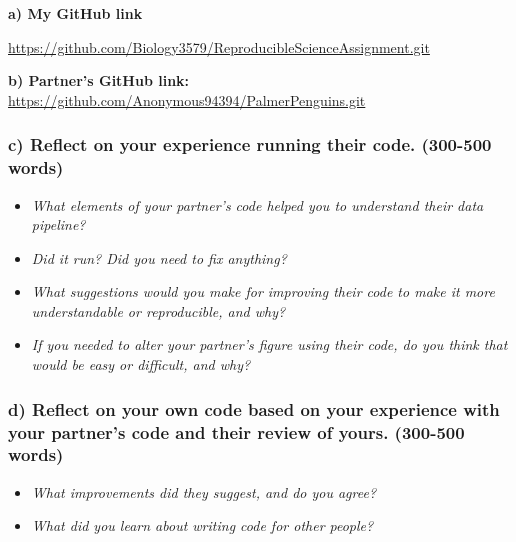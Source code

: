 \documentclass[
]{article}
\begin{document}
\textbf{a) My GitHub link}

\url{https://github.com/Biology3579/ReproducibleScienceAssignment.git}

\textbf{b) Partner's GitHub link:}
\url{https://github.com/Anonymous94394/PalmerPenguins.git}

\subsubsection{c) Reflect on your experience running their code.
(300-500
words)}\label{c-reflect-on-your-experience-running-their-code.-300-500-words}

\begin{itemize}
\item
  \emph{What elements of your partner's code helped you to understand
  their data pipeline?}
\item
  \emph{Did it run? Did you need to fix anything?}
\item
  \emph{What suggestions would you make for improving their code to make
  it more understandable or reproducible, and why?}
\item
  \emph{If you needed to alter your partner's figure using their code,
  do you think that would be easy or difficult, and why?}
\end{itemize}

\subsubsection{d) Reflect on your own code based on your experience with
your partner's code and their review of yours. (300-500
words)}\label{d-reflect-on-your-own-code-based-on-your-experience-with-your-partners-code-and-their-review-of-yours.-300-500-words}

\begin{itemize}
\item
  \emph{What improvements did they suggest, and do you agree?}
\item
  \emph{What did you learn about writing code for other people?}
\end{itemize}
\end{document}

